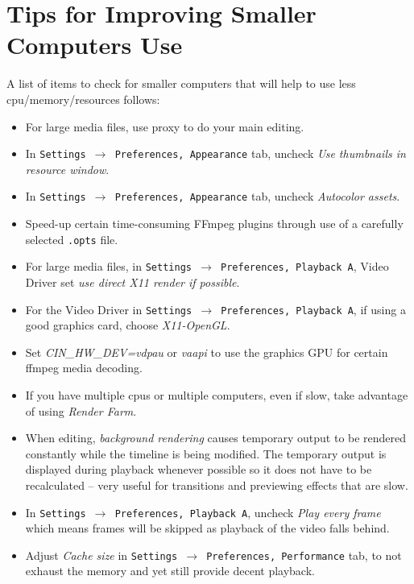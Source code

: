 \section{Tips for Improving Smaller Computers Use}%
\label{sec:tips_improving_smaller_computers}

A list of items to check for smaller computers that will help to use less cpu/memory/resources follows:

\begin{itemize}
	\item For large media files, use proxy to do your main editing.
	\item In \texttt{Settings $\rightarrow$ Preferences, Appearance} tab, uncheck \textit{Use thumbnails in resource window}.
	\item In \texttt{Settings $\rightarrow$ Preferences, Appearance} tab, uncheck \textit{Autocolor assets}.
	\item  Speed-up certain time-consuming FFmpeg plugins through use of a carefully selected \texttt{.opts} file.
	\item For large media files, in \texttt{Settings $\rightarrow$ Preferences, Playback A}, Video Driver set \textit{use direct X11 render if possible}.
	\item For the Video Driver in \texttt{Settings $\rightarrow$ Preferences, Playback A}, if using a good graphics card, choose \textit{X11-OpenGL}.
	\item Set \textit{CIN\_HW\_DEV=vdpau} or \textit{vaapi} to use the graphics GPU for certain ffmpeg media decoding.
	\item If you have multiple cpus or multiple computers, even if slow, take advantage of using \textit{Render Farm}.
	\item When editing, \textit{background rendering} causes temporary output to be rendered constantly while the
	timeline is being modified. The temporary output is displayed during playback whenever possible so 
	it does not have to be recalculated -- very useful for transitions and previewing effects that are slow.
	\item In  \texttt{Settings $\rightarrow$ Preferences, Playback A}, uncheck \textit{Play every frame} which means frames will be skipped as playback of the video falls behind.
	\item Adjust \textit{Cache size} in \texttt{Settings $\rightarrow$ Preferences, Performance} tab, to not exhaust the memory and yet still provide decent playback.
\end{itemize}

